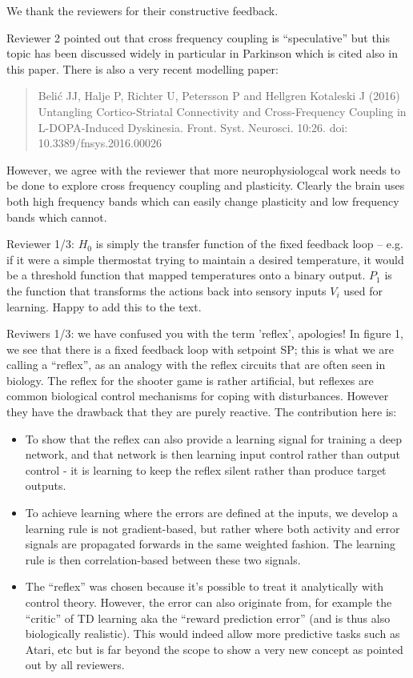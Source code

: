 \documentclass{article}
\begin{document}
We thank the reviewers for their constructive feedback.

Reviewer 2 pointed out that cross frequency coupling is ``speculative''
but this topic has been discussed widely in particular in Parkinson which
is cited also in this paper. There is also a very recent modelling paper:
\begin{quote}
  Belić JJ, Halje P, Richter U, Petersson P and Hellgren Kotaleski J (2016) Untangling Cortico-Striatal Connectivity and Cross-Frequency Coupling in L-DOPA-Induced Dyskinesia. Front. Syst. Neurosci. 10:26. doi: 10.3389/fnsys.2016.00026
\end{quote}
However, we agree with the reviewer that more neurophysiologcal work needs
to be done to explore cross frequency coupling and plasticity. Clearly
the brain uses both high frequency bands which can easily change plasticity
and low frequency bands which cannot.

Reviewer 1/3: $H_{0}$ is simply the transfer function of the fixed feedback
loop – e.g. if it were a simple thermostat trying to maintain a
desired temperature, it would be a threshold function that mapped
temperatures onto a binary output. $P_{1}$ is the function that
transforms the actions back into sensory inputs $V_{i}$ used for
learning. Happy to add this to the text.
	
Reviwers 1/3: we have confused you with the term 'reflex', apologies!
In figure 1, we see that there is a fixed feedback loop with setpoint
SP; this is what we are calling a ``reflex'', as an analogy with the
reflex circuits that are often seen in biology. The reflex for the
shooter game is rather artificial, but reflexes are common biological
control mechanisms for coping with disturbances. However they have the
drawback that they are purely reactive. The contribution here is:
\begin{itemize}
\item To show that the reflex can also provide a learning signal for
  training a deep network, and that network is then learning input
  control rather than output control - it is learning to keep the
  reflex silent rather than produce target outputs.
\item To achieve learning where the errors are defined at the inputs,
  we develop a learning rule is not gradient-based, but rather where
  both activity and error signals are propagated forwards in the same
  weighted fashion. The learning rule is then correlation-based
  between these two signals.
\item The ``reflex'' was chosen because it's possible to treat it
  analytically with control theory. However, the error can also
  originate from, for example the ``critic'' of TD learning aka the
  ``reward prediction error'' (and is thus also biologically
  realistic). This would indeed allow more predictive tasks such as
  Atari, etc but is far beyond the scope to show a very new concept as
  pointed out by all reviewers.
\end{itemize}
		
\end{document}
